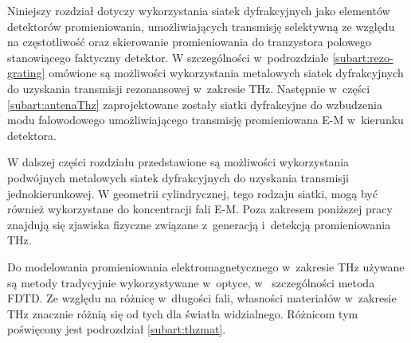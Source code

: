 Niniejszy rozdział dotyczy wykorzystania siatek dyfrakcyjnych jako elementów detektorów promieniowania, umożliwiających transmisję selektywną ze względu na częstotliwość oraz skierowanie promieniowania do tranzystora polowego stanowiącego faktyczny detektor. W szczególności w~podrozdziale \ref{subart:rezo-grating} omówione są możliwości wykorzystania metalowych siatek dyfrakcyjnych do uzyskania transmisji rezonansowej w~zakresie THz. Następnie w~części \ref{subart:antenaThz} zaprojektowane zostały siatki dyfrakcyjne do wzbudzenia modu falowodowego umożliwiającego transmisję promieniowana E-M w~kierunku detektora.

W dalszej części rozdziału przedstawione są możliwości wykorzystania podwójnych metalowych siatek dyfrakcyjnych do uzyskania transmisji jednokierunkowej. W geometrii cylindrycznej, tego rodzaju siatki, mogą być również wykorzystane do koncentracji fali E-M. Poza zakresem poniższej pracy znajdują się zjawiska fizyczne związane z~generacją i~detekcją promieniowania THz.

Do modelowania promieniowania elektromagnetycznego w~zakresie THz używane są metody tradycyjnie wykorzystywane w~optyce, w~ szczególności metoda FDTD. Ze względu na różnicę w~długości fali, własności materiałów w~zakresie THz znacznie różnią się od tych dla światła widzialnego. Różnicom tym poświęcony jest podrozdział \ref{subart:thzmat}.
